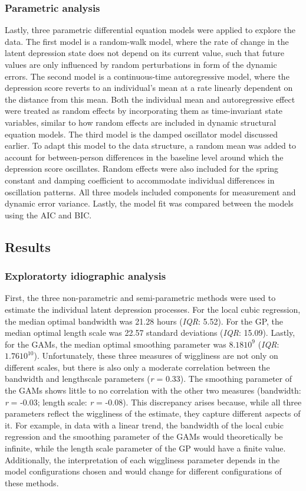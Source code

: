 \documentclass[man, floatsintext]{apa7}
\begin{document}
\subsubsection{Parametric analysis}

Lastly, three parametric differential equation models were applied to explore
the data. The first model is a random-walk model, where the rate of change in
the latent depression state does not depend on its current value, such that
future values are only influenced by random perturbations in form of the
dynamic errors.
The second model is a continuous-time autoregressive model, where the
depression score reverts to an individual's mean at a rate linearly dependent
on the distance from this mean. Both the individual mean and autoregressive
effect were treated as random effects by incorporating them as time-invariant
state variables, similar to how random effects are included
in dynamic structural equation models.
The third model is the damped oscillator model discussed earlier. To adapt this
model to the data structure, a random mean was added to account for
between-person differences in the baseline level around which the depression
score oscillates. Random effects were also included for the spring constant
and damping coefficient to accommodate individual differences in oscillation
patterns. All three models included components for measurement and dynamic
error variance. Lastly, the model fit was compared between the models
using the AIC and BIC.

\subsection{Results}

\subsubsection{Exploratorty idiographic analysis}

First, the three non-parametric and semi-parametric methods were used to
estimate the individual latent depression processes. For the local cubic
regression, the median optimal bandwidth was 21.28 hours (\textit{IQR}: 5.52).
For the GP, the median optimal length scale was 22.57 standard deviations
(\textit{IQR}: 15.09). Lastly, for the GAMs, the median optimal smoothing
parameter was $8.1810^9$ (\textit{IQR}: $1.7610^{10}$). Unfortunately, these
three measures of wiggliness are not only on different scales, but there is
also only a moderate correlation between the bandwidth and lengthscale
parameters (\textit{r} = 0.33). The smoothing parameter of the GAMs shows
little to no correlation with the other two measures (bandwidth: \textit{r} =
-0.03; length scale: \textit{r} = -0.08). This discrepancy arises because,
while all three parameters reflect the wiggliness of the estimate, they capture
different aspects of it. For example, in data with a linear trend, the
bandwidth of the local cubic regression and the smoothing parameter of the GAMs
would theoretically be infinite, while the length scale parameter of the GP
would have a finite value. Additionally, the interpretation of each
wiggliness parameter depends in the model configurations chosen and would
change for different configurations of these methods.
\end{document}
